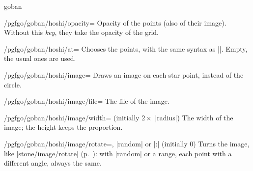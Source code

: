 \begin{environment}{{goban}}
	\begin{key}{/pgfgo/goban/hoshi/opacity=}
		Opacity of the points (also of their image). Without this \emph{key}, they take the opacity of the grid.

		\begin{codeexample}[]
			\begin{goban}[9, hoshi = {radius = 3pt, opacity = 0.3}]
			\end{goban}
		\end{codeexample}
	\end{key}

	\begin{key}{/pgfgo/goban/hoshi/at=}
		Chooses the points, with the same syntax as |\stones|. Empty, the usual ones are used.

		\begin{codeexample}[]
			\begin{goban}[9, hoshi = {at = {C3, G7}}]
			\end{goban}
		\end{codeexample}
	\end{key}

	\begin{key}{/pgfgo/goban/hoshi/image=}
		Draws an image on each star point, instead of the circle.

		\begin{codeexample}[]
			\begin{goban}[9, hoshi = {image = {file = pgfgo-hoshi.png}, radius = 3pt}]
			\end{goban}
		\end{codeexample}
	\end{key}

	\begin{key}{/pgfgo/goban/hoshi/image/file=}
		The file of the image.
	\end{key}

	\begin{key}{/pgfgo/goban/hoshi/image/width= (initially $2 \times$ |radius|)}
		The width of the image; the height keeps the proportion.
	\end{key}

	\begin{key}{/pgfgo/goban/hoshi/image/rotate=, |random| or |:| (initially 0)}
		Turns the image, like |stone/image/rotate| (p.~\pageref{subsec:piedrasimagen}): with |random| or a range, each point with a different angle, always the same.


\end{key}
\end{environment}
